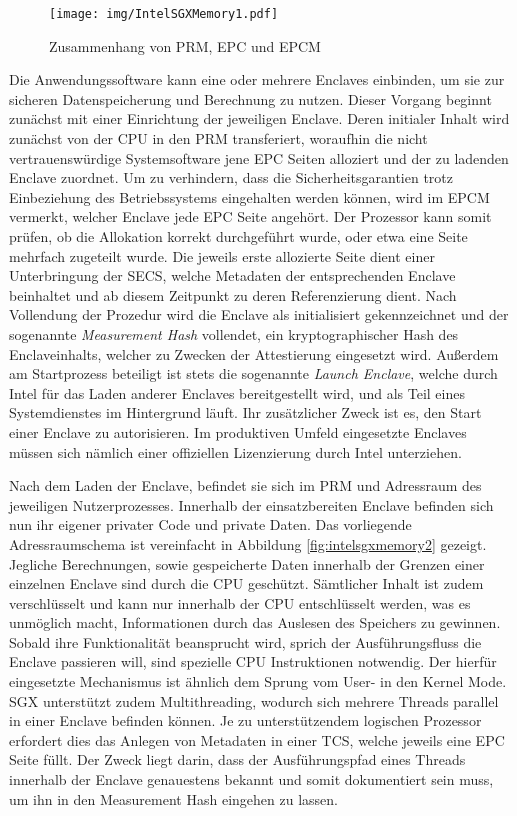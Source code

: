 \begin{figure}
	\texttt{[image: img/IntelSGXMemory1.pdf]}
	\centering
	\caption{Zusammenhang von PRM, EPC und EPCM}
	\label{fig:intelsgxmemory1}
\end{figure}

Die Anwendungssoftware kann eine oder mehrere Enclaves einbinden, um sie zur sicheren Datenspeicherung und Berechnung zu nutzen. Dieser Vorgang beginnt zunächst mit einer Einrichtung der jeweiligen Enclave. Deren initialer Inhalt wird zunächst von der \ac{CPU} in den \ac{PRM} transferiert, woraufhin die nicht vertrauenswürdige Systemsoftware jene \ac{EPC} Seiten alloziert und der zu ladenden Enclave zuordnet. Um zu verhindern, dass die Sicherheitsgarantien trotz Einbeziehung des Betriebssystems eingehalten werden können, wird im \ac{EPCM} vermerkt, welcher Enclave jede EPC Seite angehört. Der Prozessor kann somit prüfen, ob die Allokation korrekt durchgeführt wurde, oder etwa eine Seite mehrfach zugeteilt wurde. Die jeweils erste allozierte Seite dient einer Unterbringung der \ac{SECS}, welche Metadaten der entsprechenden Enclave beinhaltet und ab diesem Zeitpunkt zu deren Referenzierung dient. Nach Vollendung der Prozedur wird die Enclave als initialisiert gekennzeichnet und der sogenannte \textit{Measurement Hash} vollendet, ein kryptographischer Hash des Enclaveinhalts, welcher zu Zwecken der Attestierung eingesetzt wird. Außerdem am Startprozess beteiligt ist stets die sogenannte \textit{Launch Enclave}, welche durch Intel für das Laden anderer Enclaves bereitgestellt wird, und als Teil eines Systemdienstes im Hintergrund läuft. Ihr zusätzlicher Zweck ist es, den Start einer Enclave zu autorisieren. Im produktiven Umfeld eingesetzte Enclaves müssen sich nämlich einer offiziellen Lizenzierung durch Intel unterziehen. 

Nach dem Laden der Enclave, befindet sie sich im \ac{PRM} und Adressraum des jeweiligen Nutzerprozesses. Innerhalb der einsatzbereiten Enclave befinden sich nun ihr eigener privater Code und private Daten. Das vorliegende Adressraumschema ist vereinfacht in Abbildung \ref{fig:intelsgxmemory2} gezeigt. Jegliche Berechnungen, sowie gespeicherte Daten innerhalb der Grenzen einer einzelnen Enclave sind durch die \ac{CPU} geschützt. Sämtlicher Inhalt ist zudem verschlüsselt und kann nur innerhalb der \ac{CPU} entschlüsselt werden, was es unmöglich macht, Informationen durch das Auslesen des Speichers zu gewinnen. Sobald ihre Funktionalität beansprucht wird, sprich der Ausführungsfluss die Enclave passieren will, sind spezielle \ac{CPU} Instruktionen notwendig. Der hierfür eingesetzte Mechanismus ist ähnlich dem Sprung vom User- in den Kernel Mode. \ac{SGX} unterstützt zudem Multithreading, wodurch sich mehrere Threads parallel in einer Enclave befinden können. Je zu unterstützendem logischen Prozessor erfordert dies das Anlegen von Metadaten in einer \ac{TCS}, welche jeweils eine EPC Seite füllt. Der Zweck liegt darin, dass der Ausführungspfad eines Threads innerhalb der Enclave genauestens bekannt und somit dokumentiert sein muss, um ihn in den Measurement Hash eingehen zu lassen.

